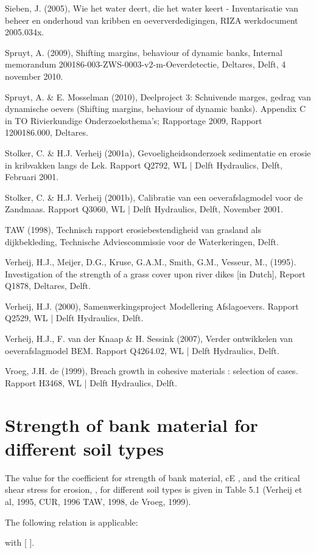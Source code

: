 Sieben, J. (2005), Wie het water deert, die het water keert - Inventarisatie van beheer en onderhoud van kribben en oeververdedigingen, RIZA werkdocument 2005.034x.

Spruyt, A. (2009), Shifting margins, behaviour of dynamic banks, Internal memorandum 200186-003-ZWS-0003-v2-m-Oeverdetectie, Deltares, Delft, 4 november 2010.

Spruyt, A. & E. Mosselman (2010), Deelproject 3: Schuivende marges, gedrag van dynamische oevers (Shifting margins, behaviour of dynamic banks).
Appendix C in TO Rivierkundige Onderzoeksthema's; Rapportage 2009, Rapport 1200186.000, Deltares.

Stolker, C. & H.J. Verheij (2001a), Gevoeligheidsonderzoek sedimentatie en erosie in kribvakken langs de Lek. Rapport Q2792, WL | Delft Hydraulics, Delft, Februari 2001.

Stolker, C. & H.J. Verheij (2001b), Calibratie van een oeverafslagmodel voor de Zandmaas. Rapport Q3060, WL | Delft Hydraulics, Delft, November 2001.

TAW (1998), Technisch rapport erosiebestendigheid van grasland als dijkbekleding, Technische Adviescommissie voor de Waterkeringen, Delft.

Verheij, H.J., Meijer, D.G., Kruse, G.A.M., Smith, G.M., Vesseur, M., (1995). Investigation of the strength of a grass cover upon river dikes [in Dutch], Report Q1878, Deltares, Delft.

Verheij, H.J. (2000), Samenwerkingsproject Modellering Afslagoevers. Rapport Q2529, WL | Delft Hydraulics, Delft.

Verheij, H.J., F. van der Knaap & H. Sessink (2007), Verder ontwikkelen van oeverafslagmodel BEM. Rapport Q4264.02, WL | Delft Hydraulics, Delft.

Vroeg, J.H. de (1999), Breach growth in cohesive materials : selection of cases. Rapport H3468, WL | Delft Hydraulics, Delft.


\chapter{Strength of bank material for different soil types}
The value for the coefficient for strength of bank material, cE , and the critical shear stress for erosion,  , for different soil types is given in Table 5.1 (Verheij et al, 1995, CUR, 1996 TAW, 1998, de Vroeg, 1999).

The following relation is applicable:
	
with   [ ].

